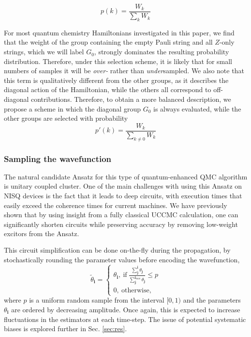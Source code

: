 \documentclass[%
 reprint,
 amsmath,amssymb,
 aps,
]{revtex4-2}
\begin{document}
\begin{equation}
    p(k) = \frac{W_k}{\sum_k W_k}
\end{equation}

For most quantum chemistry Hamiltonians investigated in this paper, we find that the weight of the group containing the empty Pauli string and all $Z$-only strings, which we will label $G_0$, strongly dominates the resulting probability distribution. Therefore, under this selection scheme, it is likely that for small numbers of samples it will be \textit{over-} rather than \textit{under}sampled. We also note that this term is qualitatively different from the other groups, as it describes the diagonal action of the Hamiltonian, while the others all correspond to off-diagonal contributions. Therefore, to obtain a more balanced description, we propose a scheme in which the diagonal group $G_0$ is always evaluated, while the other groups are selected with probability
\begin{equation}
    p'(k) = \frac{W_k}{\sum_{k\neq 0} W_k}
\end{equation}
\subsubsection{Sampling the wavefunction}

The natural candidate Ansatz for this type of quantum-enhanced QMC algorithm is unitary coupled cluster. One of the main challenges with using this Ansatz on NISQ devices is the fact that it leads to deep circuits, with execution times that easily exceed the coherence times for current machines. We have previously shown that by using insight from a fully classical UCCMC calculation,\cite{Filip2020} one can significantly shorten circuits while preserving accuracy by removing low-weight excitors from the Ansatz.\cite{Filip2022}

This circuit simplification can be done on-the-fly during the propagation, by stochastically rounding the parameter values before encoding the wavefunction,
\begin{equation}
    \widetilde \theta_\mathbf{i} = \begin{cases}
    \theta_\mathbf{i},\ \mathrm{if}\ \frac{\sum_\mathbf{j}^\mathbf{i}\theta_\mathbf{j}}{\sum_\mathbf{j}^{\mathbf{i}_\mathrm{max}}\theta_\mathbf{j}} \leq p\\
    0,\ \mathrm{otherwise},
    \end{cases}
\end{equation}
where $p$ is a uniform random sample from the interval $[0,1)$ and the parameters $\theta_\mathbf{i}$ are ordered by decreasing amplitude. Once again, this is expected to increase fluctuations in the estimators at each time-step. The issue of potential systematic biases is explored further in Sec. \ref{sec:res}.
\end{document}

